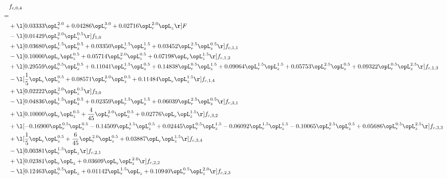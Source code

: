 \begin{alignat}{2} 
\label{eq:f_04_2} 
& f_{c,0,4} \nonumber \\ 
 = \\ 
& + \l[  0.03333 \opL_r^{2.0} +  0.04286 \opL_r^{3.0} +  0.02716 \opL_r^{2.0} \opL_z  \r] F \nonumber \\ 
& - \l[  0.01429 \opL_r^{2.0} \opL_z^{0.5}  \r] f_{1,0} \nonumber \\ 
& + \l[  0.03680 \opL_r^{1.5} \opL_z^{0.5} +  0.03350 \opL_r^{1.5} \opL_z^{1.5} +  0.03452 \opL_r^{2.5} \opL_z^{0.5}  \r] f_{c,1,1} \nonumber \\ 
& - \l[  0.10000 \opL_r \opL_z^{0.5} +  0.05714 \opL_r^{2.0} \opL_z^{0.5} +  0.07198 \opL_r \opL_z^{1.5}  \r] f_{c,1,2} \nonumber \\ 
& + \l[  0.29559 \opL_r^{0.5} \opL_z^{0.5} +  0.11041 \opL_r^{1.5} \opL_z^{0.5} +  0.14838 \opL_r^{0.5} \opL_z^{1.5} +  0.09064 \opL_r^{1.5} \opL_z^{1.5} +  0.05753 \opL_r^{2.5} \opL_z^{0.5} +  0.09322 \opL_r^{0.5} \opL_z^{2.5}  \r] f_{c,1,3} \nonumber \\ 
& - \l[ \frac{1}{5} \opL_r \opL_z^{0.5} +  0.08571 \opL_r^{2.0} \opL_z^{0.5} +  0.11484 \opL_r \opL_z^{1.5}  \r] f_{c,1,4} \nonumber \\ 
& + \l[  0.02222 \opL_r^{2.0} \opL_z^{0.5}  \r] f_{3,0} \nonumber \\ 
& - \l[  0.04836 \opL_r^{1.5} \opL_z^{0.5} +  0.02359 \opL_r^{1.5} \opL_z^{1.5} +  0.06039 \opL_r^{2.5} \opL_z^{0.5}  \r] f_{c,3,1} \nonumber \\ 
& + \l[  0.10000 \opL_r \opL_z^{0.5} + \frac{4}{45} \opL_r^{2.0} \opL_z^{0.5} +  0.02776 \opL_r \opL_z^{1.5}  \r] f_{c,3,2} \nonumber \\ 
& + \l[  -0.16900 \opL_r^{0.5} \opL_z^{0.5}   -0.14509 \opL_r^{1.5} \opL_z^{0.5} +  0.02445 \opL_r^{0.5} \opL_z^{1.5}   -0.06092 \opL_r^{1.5} \opL_z^{1.5}   -0.10065 \opL_r^{2.5} \opL_z^{0.5} +  0.05686 \opL_r^{0.5} \opL_z^{2.5}  \r] f_{c,3,3} \nonumber \\ 
& + \l[ \frac{1}{5} \opL_r \opL_z^{0.5} + \frac{6}{45} \opL_r^{2.0} \opL_z^{0.5} +  0.03887 \opL_r \opL_z^{1.5}  \r] f_{c,3,4} \nonumber \\ 
& - \l[  0.00381 \opL_r^{1.5} \opL_z  \r] f_{c,2,1} \nonumber \\ 
& + \l[  0.02381 \opL_r \opL_z +  0.03609 \opL_r \opL_z^{2.0}  \r] f_{c,2,2} \nonumber \\ 
& - \l[  0.12463 \opL_r^{0.5} \opL_z +  0.01142 \opL_r^{1.5} \opL_z +  0.10940 \opL_r^{0.5} \opL_z^{2.0}  \r] f_{c,2,3} \nonumber \\ 

\end{alignat}
